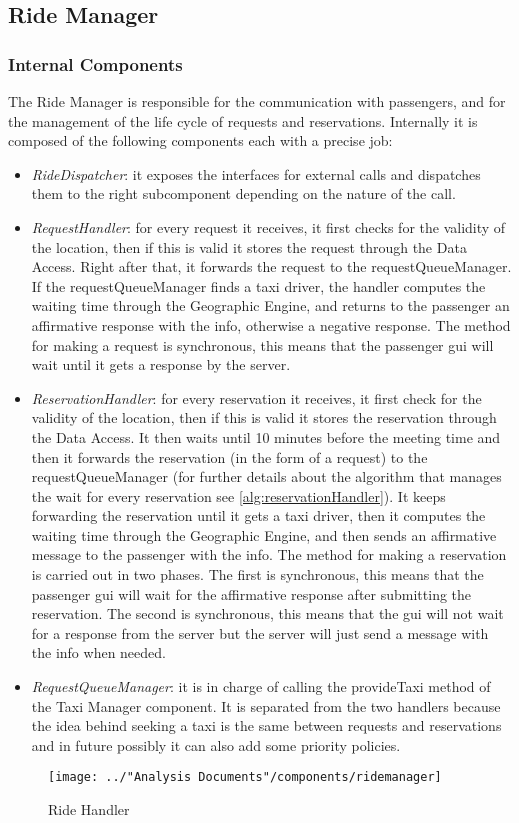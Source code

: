 \subsection{Ride Manager}\label{comp:rideManager}
\subsubsection{Internal Components}
The Ride Manager is responsible for the communication with passengers, and for the management of the life cycle of requests and reservations. Internally it is composed of the following components each with a precise job:
\begin{itemize}
	\item \textit{RideDispatcher}: it exposes the interfaces for external calls and dispatches them to the right subcomponent depending on the nature of the call.	
	\item \textit{RequestHandler}: for every request it receives, it first checks for the validity of the location, then if this is valid it stores the request through the Data Access. Right after that, it forwards the request to the requestQueueManager. If the requestQueueManager finds a taxi driver, the handler computes the waiting time through the Geographic Engine, and returns to the passenger an affirmative response with the info, otherwise a negative response. The method for making a request is synchronous, this means that the passenger gui will wait until it gets a response by the server.
	\item \textit{ReservationHandler}: for every reservation it receives, it first check for the validity of the location, then if this is valid it stores the reservation through the Data Access. It then waits until 10 minutes before the meeting time and then it forwards the reservation (in the form of a request) to the requestQueueManager (for further details about the algorithm that manages the wait for every reservation see \ref{alg:reservationHandler}). It keeps forwarding the reservation until it gets a taxi driver, then it computes the waiting time through the Geographic Engine, and then sends an affirmative message to the passenger with the info. The method for making a reservation is carried out in two phases. The first is synchronous, this means that the passenger gui will wait for the affirmative response after submitting the reservation. The second is synchronous, this means that the gui will not wait for a response from the server but the server will just send a message with the info when needed.
	\item \textit{RequestQueueManager}: it is in charge of calling the  provideTaxi method of the Taxi Manager component. It is separated from the two handlers because the idea behind seeking a taxi is the same between requests and reservations and in future possibly it can also add some priority policies.
\end{itemize}
\begin{figure}[H]
	\centering
	\texttt{[image: ../"Analysis Documents"/components/ridemanager]}
	\label{fig:rideHandler}
	\caption{Ride Handler}
\end{figure}
